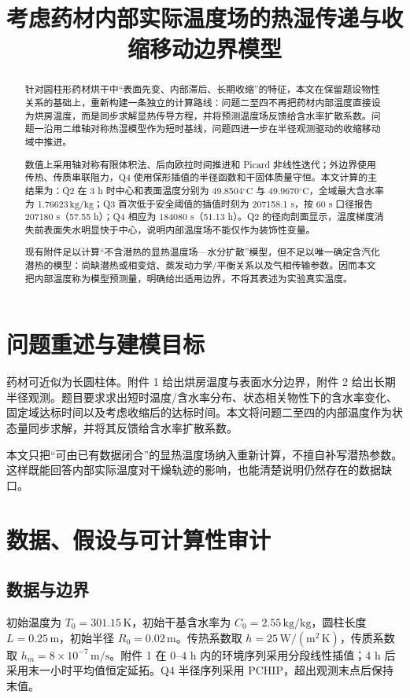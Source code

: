 \documentclass[withoutpreface,bwprint]{cumcmthesis}
\title{考虑药材内部实际温度场的热湿传递与收缩移动边界模型}
\newcommand{\kgkg}{\ensuremath{\mathrm{kg/kg}}}
\begin{document}
\maketitle

\begin{abstract}
针对圆柱形药材烘干中“表面先变、内部滞后、长期收缩”的特征，本文在保留题设物性关系的基础上，重新构建一条独立的计算路线：问题二至四不再把药材内部温度直接设为烘房温度，而是同步求解显热传导方程，并将预测温度场反馈给含水率扩散系数。问题一沿用二维轴对称热湿模型作为短时基线，问题四进一步在半径观测驱动的收缩移动域中推进。

数值上采用轴对称有限体积法、后向欧拉时间推进和 Picard 非线性迭代；外边界使用传热、传质串联阻力，Q4 使用保形插值的半径函数和干固体质量守恒。本文计算的主结果为：Q2 在 3 h 时中心和表面温度分别为 49.8504\(^{\circ}\mathrm C\) 与 49.9670\(^{\circ}\mathrm C\)，全域最大含水率为 1.76623\,\kgkg；Q3 首次低于安全阈值的插值时刻为 207158.1 s，按 60 s 口径报告 207180 s（57.55 h）；Q4 相应为 184080 s（51.13 h）。Q2 的径向剖面显示，温度梯度消失前表面失水明显快于中心，说明内部温度场不能仅作为装饰性变量。

现有附件足以计算“不含潜热的显热温度场—水分扩散”模型，但不足以唯一确定含汽化潜热的模型：尚缺潜热或相变焓、蒸发动力学/平衡关系以及气相传输参数。因而本文把内部温度称为模型预测量，明确给出适用边界，不将其表述为实验真实温度。
\end{abstract}

\section{问题重述与建模目标}
药材可近似为长圆柱体。附件 1 给出烘房温度与表面水分边界，附件 2 给出长期半径观测。题目要求求出短时温度/含水率分布、状态相关物性下的含水率变化、固定域达标时间以及考虑收缩后的达标时间。本文将问题二至四的内部温度作为状态量同步求解，并将其反馈给含水率扩散系数。

本文只把“可由已有数据闭合”的显热温度场纳入重新计算，不擅自补写潜热参数。这样既能回答内部实际温度对干燥轨迹的影响，也能清楚说明仍然存在的数据缺口。

\section{数据、假设与可计算性审计}
\subsection{数据与边界}
初始温度为 $T_0=301.15\,\mathrm K$，初始干基含水率为 $C_0=2.55\,\kgkg$，圆柱长度 $L=0.25\,\mathrm m$，初始半径 $R_0=0.02\,\mathrm m$。传热系数取 $h=25\,\mathrm{W/(m^2\,K)}$，传质系数取 $h_m=8\times10^{-7}\,\mathrm{m/s}$。附件 1 在 $0$--$4$ h 内的环境序列采用分段线性插值；4 h 后采用末一小时平均值恒定延拓。Q4 半径序列采用 PCHIP，超出观测末点后保持末值。
\end{document}
